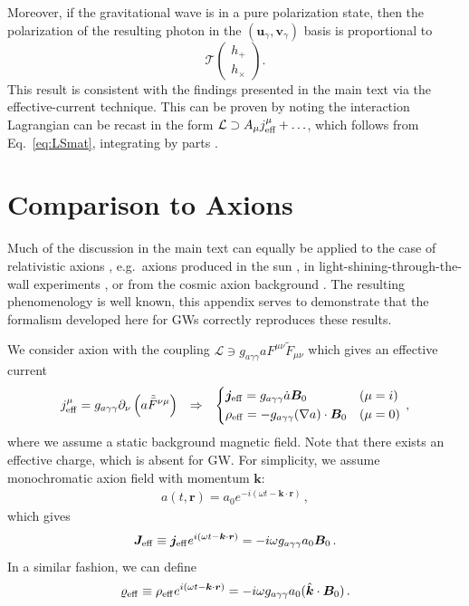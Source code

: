 \documentclass[a4paper,11pt]{article}
\begin{document}
%
Moreover, if the gravitational wave is in a pure polarization state, then the polarization of the resulting photon in the $(\bm{u}_{\gamma}, \bm{v}_{\gamma})$ basis is proportional to
%
\begin{equation}
\mathcal{T}
\left(
\begin{array}{c}
 h_+ \\ h_\times
\end{array}
\right).
\label{eq:ThAppH}
\end{equation}
%
This result is consistent with the findings presented in the main text via the effective-current technique. This can be proven by noting the interaction Lagrangian can be recast in the form ${\cal L} \supset A_\mu j_\text{eff}^\mu + \ldots$, which follows from Eq.~\eqref{eq:LSmat}, integrating by parts \cite{Aggarwal:2025noe}.



\section{Comparison to Axions}
\label{app:axion}

Much of the discussion in the main text can equally be applied to the case of relativistic axions \cite{Raffelt:1987im}, e.g.\ axions produced in the sun \cite{Caputo:2024oqc},  in light-shining-through-the-wall experiments \cite{Sikivie:1983ip,Graham:2015ouw,CAST:2017uph,IAXO:2019mpb}, or from the cosmic axion background \cite{Dror:2021nyr}. The resulting phenomenology is well known, this appendix serves to demonstrate that the formalism developed here for GWs correctly reproduces these results.


We consider axion with the coupling $ \mathcal{L} \ni g_{a\gamma\gamma} a F^{\mu\nu} \tilde{F}_{\mu\nu}  $ which gives an effective current
\begin{align}
    j_{\rm eff}^{\mu} = g_{a\gamma\gamma} \partial_{\nu} \left( a \tilde{\bar{F}}^{\nu\mu} \right)  && \Rightarrow &&
\begin{dcases}
     \bm{j}_{\rm eff} = g_{a\gamma\gamma} \dot{a} \bm{B}_{0} & (\mu = i) \\ \rho_{\rm eff} = - g_{a\gamma\gamma} (\nabla a ) \cdot \bm{B}_{0} & (\mu = 0) 
\end{dcases} \,,
\end{align}
%
where we assume a static background magnetic field.
%
Note that there exists an effective charge, which is absent for GW. 
%
For simplicity, we assume monochromatic axion field with momentum $ \bm{k} $:
%
\begin{align}
    a(t, {\bm r}) = a_{0} e^{-i (\omega t - \bm{k}\cdot\bm{r} ) } \,,
\end{align}
which gives
\begin{align}
    \bm{J}_{\rm eff} \equiv \bm{j}_{\rm eff}  e^{i (\omega t - \bm{k}\cdot\bm{r} ) }  = -i \omega g_{a\gamma\gamma} a_{0} \bm{B}_{0} \,.
\end{align}
%
In a similar fashion, we can define
\begin{align}
    \varrho_{\rm eff}  \equiv \rho_{\rm eff} e^{i (\omega t - \bm{k}\cdot\bm{r} ) } = - i \omega g_{a\gamma\gamma} a_{0} (\hat{\bm{k}} \cdot \bm{B}_{0}) \,.
\end{align}
\end{document}

